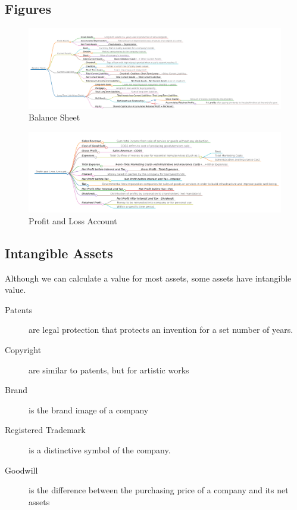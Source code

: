 \documentclass{standalone}
\begin{document}
\subsection{Figures}
\begin{figure}[h]
\begin{center}
	\includegraphics[width=\textwidth]{./figures/unit 3/bs.png}
	\caption{Balance Sheet}
\end{center}
\end{figure}

\begin{figure}[h]
\begin{center}
	\includegraphics[width=\textwidth]{./figures/unit 3/pl.png}
	\caption{Profit and Loss Account}
\end{center}
\end{figure}

\subsection{Intangible Assets}
Although we can calculate a value for most assets, some assets have intangible value.
\begin{description}
    \item[Patents] are legal protection that protects an invention for a set number of years.
    \item[Copyright] are similar to patents, but for artistic works
    \item[Brand] is the brand image of a company
    \item[Registered Trademark] is a distinctive symbol of the company.
    \item[Goodwill] is the difference between the purchasing price of a company and its net assets
\end{description}
\end{document}
